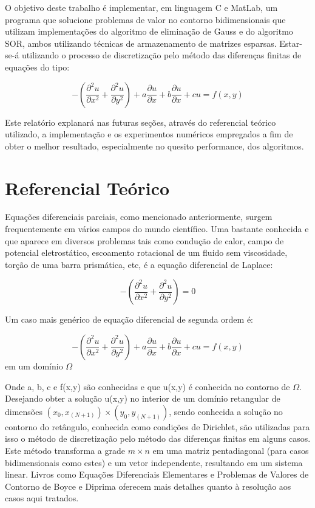 \documentclass[
	article,			%
	11pt,				%
	oneside,			%
	a4paper,			%
	english,			%
	brazil,				%
	sumario=tradicional
	]{abntex2}
\begin{document}
O objetivo deste trabalho é implementar, em linguagem C e MatLab, um programa que solucione problemas de valor no contorno bidimensionais que utilizam implementações do algoritmo de eliminação de Gauss e do algoritmo SOR, ambos utilizando técnicas de armazenamento de matrizes esparsas. Estar-se-á utilizando o processo de discretização pelo método das diferenças finitas de equações do tipo:

\[ -\left(\frac{\partial^2 u}{\partial x^2}+\frac{\partial^2 u}{\partial y^2}\right)+a\frac{\partial u}{\partial x}+b\frac{\partial u}{\partial x}+cu=f(x,y) \]

Este relatório explanará nas futuras seções, através do referencial teórico utilizado, a implementação e os experimentos numéricos empregados a fim de obter o melhor resultado, especialmente no quesito performance, dos algoritmos. 


\section{Referencial Teórico}

Equações diferenciais parciais, como mencionado anteriormente, surgem frequentemente em vários campos do mundo científico. Uma bastante conhecida e que aparece em diversos problemas tais como condução de calor, campo de potencial eletrostático, escoamento rotacional de um fluido sem viscosidade, torção de uma barra prismática, etc, é a equação diferencial de Laplace:

\[ -\left(\frac{\partial^2 u}{\partial x^2}+\frac{\partial^2 u}{\partial y^2}\right) = 0 \]

Um caso mais genérico de equação diferencial de segunda ordem é:

\begin{center} \[ -\left(\frac{\partial^2 u}{\partial x^2}+\frac{\partial^2 u}{\partial y^2}\right)+a\frac{\partial u}{\partial x}+b\frac{\partial u}{\partial x}+cu=f(x,y) \] em um domínio $ \Omega $ \end{center}

Onde a, b, c e f(x,y) são conhecidas e que u(x,y) é conhecida no contorno de $\Omega$. Desejando obter a solução u(x,y) no interior de um domínio retangular de dimensões $(x_{0},x_{(N+1)})\times(y_{0},y_{(N+1)})$, sendo conhecida a solução no contorno do retângulo, conhecida como condições de Dirichlet, são utilizadas para isso o método de discretização pelo método das diferenças finitas em alguns casos. Este método transforma a grade $m \times n$ em uma matriz pentadiagonal (para casos bidimensionais como estes) e um vetor independente, resultando em um sistema linear. Livros como Equações Diferenciais Elementares e Problemas de Valores de Contorno de Boyce e Diprima oferecem mais detalhes quanto à resolução aos casos aqui tratados.
\end{document}
